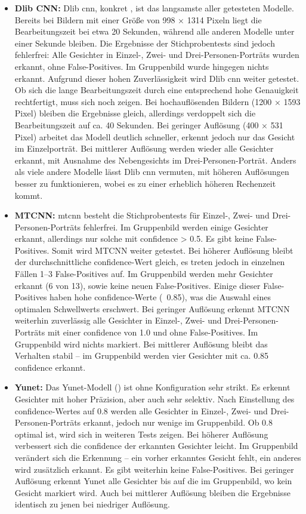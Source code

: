 \begin{itemize}
	\item \textbf{Dlib CNN:} Dlib \gls{cnn}, konkret , ist das langsamste aller getesteten Modelle. Bereits bei Bildern mit einer Größe von 998 × 1314 Pixeln liegt die Bearbeitungszeit bei etwa 20 Sekunden, während alle anderen Modelle unter einer Sekunde bleiben. Die Ergebnisse der Stichprobentests sind jedoch fehlerfrei: Alle Gesichter in Einzel-, Zwei- und Drei-Personen-Porträts wurden erkannt, ohne False-Positives. Im Gruppenbild wurde hingegen nichts erkannt. Aufgrund dieser hohen Zuverlässigkeit wird Dlib \gls{cnn} weiter getestet. Ob sich die lange Bearbeitungszeit durch eine entsprechend hohe Genauigkeit rechtfertigt, muss sich noch zeigen. Bei hochauflösenden Bildern (1200 × 1593 Pixel) bleiben die Ergebnisse gleich, allerdings verdoppelt sich die Bearbeitungszeit auf ca. 40 Sekunden. Bei geringer Auflösung (400 × 531 Pixel) arbeitet das Modell deutlich schneller, erkennt jedoch nur das Gesicht im Einzelporträt. Bei mittlerer Auflösung werden wieder alle Gesichter erkannt, mit Ausnahme des Nebengesichts im Drei-Personen-Porträt. Anders als viele andere Modelle lässt Dlib \gls{cnn} vermuten, mit höheren Auflösungen besser zu funktionieren, wobei es zu einer erheblich höheren Rechenzeit kommt.
%	
	\item \textbf{MTCNN:} \gls{mtcnn} besteht die Stichprobentests für Einzel-, Zwei- und Drei-Personen-Porträts fehlerfrei. Im Gruppenbild werden einige Gesichter erkannt, allerdings nur solche mit \gls{confidence} > 0.5. Es gibt keine False-Positives. Somit wird MTCNN weiter getestet. Bei höherer Auflösung bleibt der durchschnittliche \gls{confidence}-Wert gleich, es treten jedoch in einzelnen Fällen 1–3 False-Positives auf. Im Gruppenbild werden mehr Gesichter erkannt (6 von 13), sowie keine neuen False-Positives. Einige dieser False-Positives haben hohe \gls{confidence}-Werte (~0.85), was die Auswahl eines optimalen Schwellwerts erschwert. Bei geringer Auflösung erkennt MTCNN weiterhin zuverlässig alle Gesichter in Einzel-, Zwei- und Drei-Personen-Porträts mit einer \gls{confidence} von 1.0 und ohne False-Positives. Im Gruppenbild wird nichts markiert. Bei mittlerer Auflösung bleibt das Verhalten stabil – im Gruppenbild werden vier Gesichter mit ca. 0.85 \gls{confidence} erkannt.
%	
	\item \textbf{Yunet:} Das Yunet-Modell () ist ohne Konfiguration sehr strikt. Es erkennt Gesichter mit hoher Präzision, aber auch sehr selektiv. Nach Einstellung des \gls{confidence}-Wertes auf 0.8 werden alle Gesichter in Einzel-, Zwei- und Drei-Personen-Porträts erkannt, jedoch nur wenige im Gruppenbild. Ob 0.8 optimal ist, wird sich in weiteren Tests zeigen. Bei höherer Auflösung verbessert sich die \gls{confidence} der erkannten Gesichter leicht. Im Gruppenbild verändert sich die Erkennung – ein vorher erkanntes Gesicht fehlt, ein anderes wird zusätzlich erkannt. Es gibt weiterhin keine False-Positives. Bei geringer Auflösung erkennt Yunet alle Gesichter bis auf die im Gruppenbild, wo kein Gesicht markiert wird. Auch bei mittlerer Auflösung bleiben die Ergebnisse identisch zu jenen bei niedriger Auflösung.

\end{itemize}
